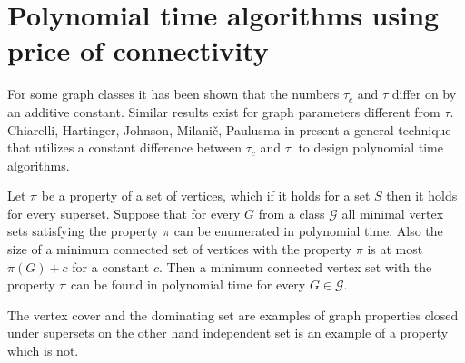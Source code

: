 \chapter{Polynomial time algorithms using price of connectivity}\label{chap2}

For some graph classes it has been shown that the numbers \(\tau_c\) and \(\tau\) differ on by an additive constant.
Similar results exist for graph parameters different from \(\tau\).
Chiarelli, Hartinger, Johnson, Milanič, Paulusma in \cite{ChiarelliHartinger18} present a general technique that utilizes a constant difference between \(\tau_c\)
and \(\tau\).
to design polynomial time algorithms. 

\begin{lemma}\label{algo:polylemma}
	Let \(\pi\) be a property of a set of vertices, which if it holds for a set \(S\) then it holds for every superset.
	Suppose that for every \(G\) from a class \(\mathcal{G}\) all minimal vertex sets satisfying the property \(\pi\) can be enumerated in polynomial time.
	Also the size of a minimum connected set of vertices with the property \(\pi\) is at most \(\pi(G) + c\) for a constant \(c\). 
	Then a minimum connected vertex set with the property \(\pi\) can be found in polynomial time for every \(G \in \mathcal{G}\).
\end{lemma}
The vertex cover and the dominating set are examples of graph properties closed under supersets on the other hand independent set is an example of a property which is not. 

